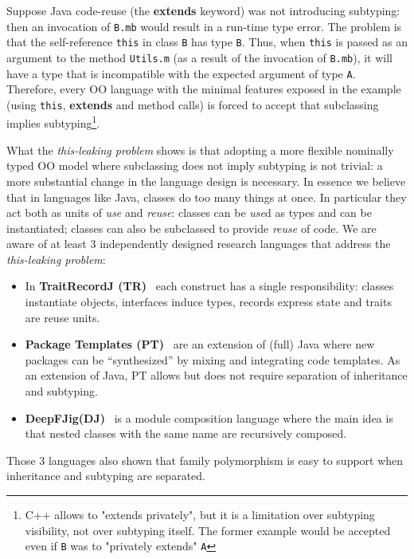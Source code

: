Suppose Java code-reuse (the {\bf extends} keyword) was not introducing subtyping: then an invocation of 
\lstinline{B.mb} would result in a run-time type error.
The problem is that the
self-reference \lstinline{this} in class \lstinline{B} has 
type \lstinline{B}. Thus, when \lstinline{this} is passed as an argument to 
the method \lstinline{Utils.m} (as a result of the invocation of
\lstinline{B.mb}), it will have a type that is incompatible with the
expected argument of type \lstinline{A}.  
Therefore, every OO language with the minimal features exposed in the example (using \lstinline{this},
{\bf extends} and method calls) is forced to accept that subclassing implies
subtyping\footnote{C++ allows to "extends privately", but it is a limitation over
  subtyping visibility, not over subtyping itself.  The
  former example would be accepted even if \lstinline{B} was to
  "privately extends" \lstinline{A}}.
  

What the \emph{this-leaking problem} shows is that adopting a more flexible
nominally typed OO model where subclassing does not imply subtyping is
not trivial: a more substantial change in the language design is
necessary.  In essence we believe that in languages like Java, classes do too many
things at once. In particular they act both as units of \emph{use} and
\emph{reuse}: classes can be \emph{use}d as types and can be instantiated;
classes can also be subclassed to provide \emph{reuse} of code.
We are aware of at least 3 independently designed research
languages that address the \emph{this-leaking problem}:
\begin{itemize}
\item In {\bf TraitRecordJ (TR)}~\cite{Bettini:2010:ISP:1774088.1774530,BETTINI2013521,Bettini2015282}
each construct has a single responsibility: classes instantiate objects,
interfaces induce types, records express state and traits are reuse units.
\item {\bf Package Templates (PT)}~\cite{KrogdahlMS09,DBLP:journals/taosd/AxelsenSKM12,DBLP:conf/gpce/AxelsenK12}
are an extension of (full) Java where new packages can be ``synthesized'' by mixing
and integrating code templates. As an extension of Java, PT allows but does not require
separation of inheritance and subtyping.
\item {\bf
    DeepFJig(DJ)}~\cite{deep,servetto2014meta,fjig} is
a module composition language where the main idea is that
nested classes with the same name are recursively composed.
\end{itemize}
Those 3 languages also shown that family polymorphism 
is easy to support when inheritance and subtyping are separated.


